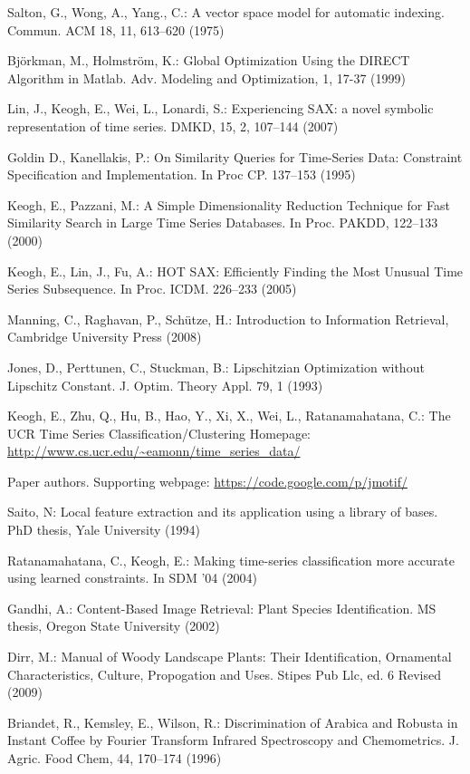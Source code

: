 \documentclass[conference]{IEEEtran}
\begin{document}
\begin{thebibliography}{4}
Salton, G., Wong, A., Yang., C.:
A vector space model for automatic indexing. 
Commun. ACM 18, 11, 613--620 (1975)

Bj\"{o}rkman, M., Holmstr\"{o}m, K.:
Global Optimization Using the DIRECT Algorithm in Matlab.
Adv. Modeling and Optimization, 1, 17-37 (1999)

Lin, J., Keogh, E., Wei, L., Lonardi, S.:
Experiencing SAX: a novel symbolic representation of time series.
DMKD, 15, 2, 107--144 (2007)

Goldin D., Kanellakis, P.:
On Similarity Queries for Time-Series Data: Constraint Specification and Implementation. 
In Proc CP. 137--153 (1995)

Keogh, E., Pazzani, M.:
A Simple Dimensionality Reduction Technique for Fast Similarity Search in Large Time Series
Databases. In Proc. PAKDD, 122--133 (2000)

Keogh, E., Lin, J., Fu, A.:
HOT SAX: Efficiently Finding the Most Unusual Time Series Subsequence. 
In Proc. ICDM. 226--233 (2005)

Manning, C., Raghavan, P., Sch\"utze, H.: 
Introduction to Information Retrieval, Cambridge University Press (2008)

Jones, D., Perttunen, C., Stuckman, B.:
Lipschitzian Optimization without Lipschitz Constant.
J. Optim. Theory Appl. 79, 1 (1993)

Keogh, E., Zhu, Q., Hu, B., Hao, Y.,  Xi, X., Wei, L., Ratanamahatana, C.:
The UCR Time Series Classification/Clustering Homepage:
\url{http://www.cs.ucr.edu/~eamonn/time_series_data/}

Paper authors. Supporting webpage:
\url{https://code.google.com/p/jmotif/}

Saito, N:
Local feature extraction and its application using a library of bases. 
PhD thesis, Yale University (1994)

Ratanamahatana, C., Keogh, E.:
Making time-series classification more accurate using learned constraints. 
In SDM '04 (2004)

Gandhi, A.:
Content-Based Image Retrieval: Plant Species Identification. 
MS thesis, Oregon State University (2002)

Dirr, M.:
Manual of Woody Landscape Plants: Their Identification, Ornamental Characteristics,
Culture, Propogation and Uses.
Stipes Pub Llc, ed. 6 Revised (2009)

Briandet, R., Kemsley, E., Wilson, R.:
Discrimination of Arabica and Robusta in Instant Coffee by Fourier Transform Infrared Spectroscopy
and Chemometrics.
J. Agric. Food Chem, 44, 170--174 (1996)

\end{thebibliography}

\end{document}
